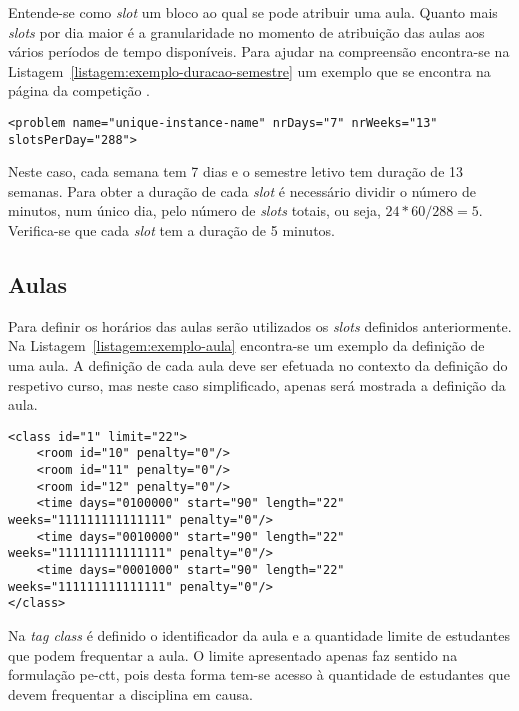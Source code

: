 Entende-se como \textit{slot} um bloco ao qual se pode atribuir uma aula. Quanto mais \textit{slots} por dia maior é a granularidade no momento de atribuição das aulas aos vários períodos de tempo disponíveis. Para ajudar na compreensão encontra-se na Listagem~\ref{listagem:exemplo-duracao-semestre} um exemplo que se encontra na página da competição \cite{itc2019-Website}.

\begin{minipage}[c]{\linewidth}
\begin{lstlisting}[caption={Exemplo da definição da duração do semestre.}, label={listagem:exemplo-duracao-semestre}]
<problem name="unique-instance-name" nrDays="7" nrWeeks="13" slotsPerDay="288">
\end{lstlisting}
\end{minipage}

Neste caso, cada semana tem 7 dias e o semestre letivo tem duração de 13 semanas. Para obter a duração de cada \textit{slot} é necessário dividir o número de minutos, num único dia, pelo número de \textit{slots} totais, ou seja, $24*60/288 = 5$. Verifica-se que cada \textit{slot} tem a duração de 5 minutos.

\subsection{Aulas}

Para definir os horários das aulas serão utilizados os \textit{slots} definidos anteriormente. Na Listagem~\ref{listagem:exemplo-aula} encontra-se um exemplo da definição de uma aula. A definição de cada aula deve ser efetuada no contexto da definição do respetivo curso, mas neste caso simplificado, apenas será mostrada a definição da aula.

\begin{minipage}[c]{\linewidth}
\begin{lstlisting}[caption={Exemplo da definição de uma aula.}, label={listagem:exemplo-aula}]
<class id="1" limit="22">
    <room id="10" penalty="0"/>
    <room id="11" penalty="0"/>
    <room id="12" penalty="0"/>
    <time days="0100000" start="90" length="22" weeks="111111111111111" penalty="0"/>
    <time days="0010000" start="90" length="22" weeks="111111111111111" penalty="0"/>
    <time days="0001000" start="90" length="22" weeks="111111111111111" penalty="0"/>
</class>
\end{lstlisting}
\end{minipage}

Na \textit{tag class} é definido o identificador da aula e a quantidade limite de estudantes que podem frequentar a aula. O limite apresentado apenas faz sentido na formulação \gls{pe-ctt}, pois desta forma tem-se acesso à quantidade de estudantes que devem frequentar a disciplina em causa.

